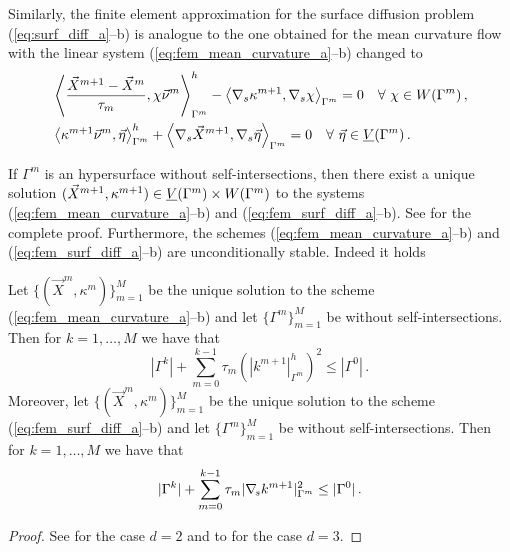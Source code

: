 Similarly, the finite element approximation for the surface diffusion problem
(\ref{eq:surf_diff_a}--b) is analogue to the one obtained for the mean
curvature flow with the linear system (\ref{eq:fem_mean_curvature_a}--b)
changed to
\begin{subequations}
\begin{align}
&\left\langle \frac{\vec X^{m + 1} - \vec X^m}{\tau_m},
\chi\vec \nu^m\right\rangle_{\Gamma^m}^h - \left\langle\nabla_s\kappa^{m+1},
\nabla_s\chi\right\rangle_{\Gamma^m}=0\quad \forall\ \chi \in
W(\Gamma^m)\,,\label{eq:fem_surf_diff_a}\\
&\left\langle\kappa^{m+1}\vec \nu^m, \vec \eta\right\rangle_{\Gamma^m}^h +
\left\langle\nabla_s\vec X^{m + 1},
\nabla_s\vec \eta\right\rangle_{\Gamma^m}=0\quad \forall\ \vec\eta \in \underline{V}(\Gamma^m)\,.
\label{eq:fem_surf_diff_b}
\end{align}
\end{subequations}

If $\Gamma^m$ is an hypersurface without self-intersections, then there exist
a unique solution $(\vec X^{m+1}, \kappa^{m+1}) \in \underline{V}(\Gamma^m) \times W(\Gamma^m)$ to the
systems (\ref{eq:fem_mean_curvature_a}--b) and (\ref{eq:fem_surf_diff_a}--b).
See \cite[Theorem~2.1]{gflows3d} for the complete proof. Furthermore,
the schemes (\ref{eq:fem_mean_curvature_a}--b) and
(\ref{eq:fem_surf_diff_a}--b) are unconditionally stable. Indeed it holds
\begin{theorem}
Let $\{(\vec X^m, \kappa^m)\}_{m=1}^M$ be the unique solution to the scheme
(\ref{eq:fem_mean_curvature_a}--b) and let $\{\Gamma^m\}_{m=1}^M$
be without self-intersections. Then for ${k=1,\ldots,M}$ we have that
\begin{equation*}
|\Gamma^k|+\sum_{m=0}^{k-1} \tau_m(|k^{m+1}|_{\Gamma^m}^h)^2\leq|\Gamma^0|\,.
\end{equation*}
Moreover, let $\{(\vec X^m, \kappa^m)\}_{m=1}^M$ be the unique solution to the
scheme (\ref{eq:fem_surf_diff_a}--b) and let $\{\Gamma^m\}_{m=1}^M$ be without
self-intersections. Then for $k=1,\ldots,M$ we have that
\begin{equation*}
|\Gamma^k|+\sum_{m=0}^{k-1}\tau_m|\nabla_{\!s} k^{m+1}|_{\Gamma^m}^2\leq|\Gamma^0|\,.
\end{equation*}

\begin{proof}
See \cite[Theorem~2.3]{triplej} for the case $d = 2$ and to
\cite[Theorem~2.2]{gflows3d} for the case $d = 3$.
\end{proof}

\end{theorem}

